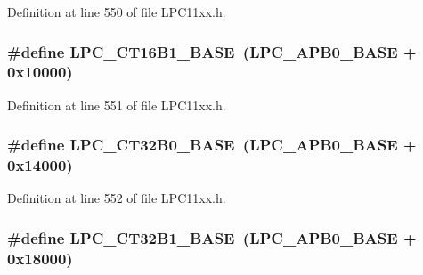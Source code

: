 Definition at line 550 of file L\+P\+C11xx.\+h.

\subsubsection[{\texorpdfstring{L\+P\+C\+\_\+\+C\+T16\+B1\+\_\+\+B\+A\+SE}{LPC_CT16B1_BASE}}]{\setlength{\rightskip}{0pt plus 5cm}\#define L\+P\+C\+\_\+\+C\+T16\+B1\+\_\+\+B\+A\+SE~({\bf L\+P\+C\+\_\+\+A\+P\+B0\+\_\+\+B\+A\+SE} + 0x10000)}\hypertarget{group___l_p_c11xx___definitions_ga5f33f849b010785defa0105cf6eb87f1}{}\label{group___l_p_c11xx___definitions_ga5f33f849b010785defa0105cf6eb87f1}


Definition at line 551 of file L\+P\+C11xx.\+h.

\subsubsection[{\texorpdfstring{L\+P\+C\+\_\+\+C\+T32\+B0\+\_\+\+B\+A\+SE}{LPC_CT32B0_BASE}}]{\setlength{\rightskip}{0pt plus 5cm}\#define L\+P\+C\+\_\+\+C\+T32\+B0\+\_\+\+B\+A\+SE~({\bf L\+P\+C\+\_\+\+A\+P\+B0\+\_\+\+B\+A\+SE} + 0x14000)}\hypertarget{group___l_p_c11xx___definitions_ga10dcc3ac224bf132010cb6bc6fc7d9c9}{}\label{group___l_p_c11xx___definitions_ga10dcc3ac224bf132010cb6bc6fc7d9c9}


Definition at line 552 of file L\+P\+C11xx.\+h.

\subsubsection[{\texorpdfstring{L\+P\+C\+\_\+\+C\+T32\+B1\+\_\+\+B\+A\+SE}{LPC_CT32B1_BASE}}]{\setlength{\rightskip}{0pt plus 5cm}\#define L\+P\+C\+\_\+\+C\+T32\+B1\+\_\+\+B\+A\+SE~({\bf L\+P\+C\+\_\+\+A\+P\+B0\+\_\+\+B\+A\+SE} + 0x18000)}\hypertarget{group___l_p_c11xx___definitions_ga70f807832b5a2afb17265d22fed6160d}{}\label{group___l_p_c11xx___definitions_ga70f807832b5a2afb17265d22fed6160d}


